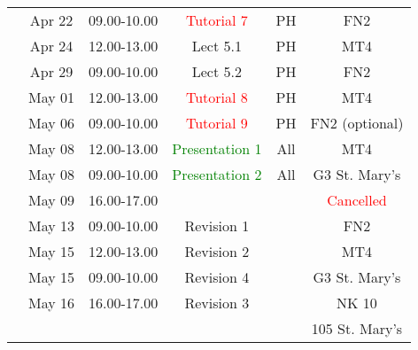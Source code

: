 \documentclass[11pt,oneside,a4paper]{article}
\begin{document}
\begin{center}
\begin{tabular}{||c||c|c|c|c|c||}
\hline\hline
                                      &          &             &             &     &               \\
\hline\hline
\multirow{2}{*}{\color{red}{Week 41}} & Apr 22   & 09.00-10.00 & \textcolor{red}{Tutorial 7}  & PH  & FN2  \\
                                      & Apr 24   & 12.00-13.00 & Lect  5.1  & PH  & MT4   \\
\hline
\multirow{2}{*}{\color{red}{Week 42}} & Apr 29   & 09.00-10.00 & Lect  5.2  & PH   & FN2 \\
                                      & May 01   & 12.00-13.00 & \textcolor{red}{Tutorial 8} & PH  & MT4  \\
\hline
\multirow{4}{*}{\color{red}{Week 43}} & May 06   & 09.00-10.00 & \textcolor{red}{Tutorial 9}  & PH  & FN2 (optional) \\
                                      & May 08   & 12.00-13.00 & \textcolor{green}{Presentation 1}  & All & MT4 \\
                                      & May 08   & 09.00-10.00 & \textcolor{green}{Presentation 2}  & All & G3 St. Mary's \\
                                      & May 09   & 16.00-17.00 &            &     & \textcolor{red}{Cancelled} \\
\hline
\multirow{5}{*}{\color{red}{Week 44}} & May 13   & 09.00-10.00 & Revision 1  &     & FN2  \\
                                      & May 15   & 12.00-13.00 & Revision 2  &     & MT4 \\
                                      & May 15   & 09.00-10.00 & Revision 4  &     & G3 St. Mary's \\
                                      & May 16   & 16.00-17.00 & Revision 3  &     & NK 10 \\
                                      &          &             &             &     & 105 St. Mary's \\
\hline

\hline\hline

\end{tabular}
\end{center}
\end{document}
